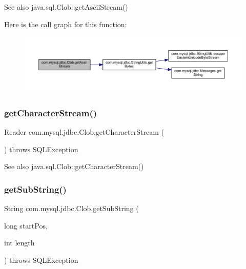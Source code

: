 \begin{DoxySeeAlso}{See also}
java.\+sql.\+Clob\+::get\+Ascii\+Stream() 
\end{DoxySeeAlso}
Here is the call graph for this function\+:\nopagebreak
\begin{figure}[H]
\begin{center}
\leavevmode
\includegraphics[width=350pt]{classcom_1_1mysql_1_1jdbc_1_1_clob_a26b535e118f453c6524ef55fa26a2218_cgraph}
\end{center}
\end{figure}
\mbox{\label{classcom_1_1mysql_1_1jdbc_1_1_clob_abad22d4373aa8e404953be02f63db1fa}} 
\subsubsection{\texorpdfstring{get\+Character\+Stream()}{getCharacterStream()}}
{\footnotesize\ttfamily Reader com.\+mysql.\+jdbc.\+Clob.\+get\+Character\+Stream (\begin{DoxyParamCaption}{ }\end{DoxyParamCaption}) throws S\+Q\+L\+Exception}

\begin{DoxySeeAlso}{See also}
java.\+sql.\+Clob\+::get\+Character\+Stream() 
\end{DoxySeeAlso}
\mbox{\label{classcom_1_1mysql_1_1jdbc_1_1_clob_a307a0f6842fe4db4f8753a61f5ae612c}} 
\subsubsection{\texorpdfstring{get\+Sub\+String()}{getSubString()}}
{\footnotesize\ttfamily String com.\+mysql.\+jdbc.\+Clob.\+get\+Sub\+String (\begin{DoxyParamCaption}\item[{long}]{start\+Pos,  }\item[{int}]{length }\end{DoxyParamCaption}) throws S\+Q\+L\+Exception}

